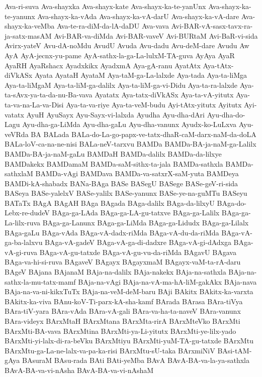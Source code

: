 {Ava-ri-suva
Ava-shayxka
Ava-shayx-kate
Ava-shayx-ka-te-yanUnx
Ava-shayx-ka-te-yanunx
Ava-shayx-ka-vAda
Ava-shayx-ka-vA-darU
Ava-shayx-ka-vA-dare
Ava-shayx-ka-veMba
Ava-te-ra-diM-da-lA-daDU
Ava-vava
Avi-BAR-vA-sasx-tavx-ra-ja-satx-masAM
Avi-BAR-va-diMda
Avi-BAR-vaveV
Avi-BURtaM
Avi-BaR-vi-sida
Avirx-yateV
Avu-dA-noMdu
AvudU
Avuda
Avu-dadu
Avu-deM-dare
Avudu
Aw
AyA
AyA-jecnx-yu-pame
AyA-sathx-la-ga-La-lulxM-TA-guva
AyAya
AyaR
AyaRH
AyaRshacx
Ayadxkikx
AyadxmA
Aya-gA-ranu
AyatAtx
Aya-tAtx-diVkASx
Ayata
AyataH
AyataM
Aya-taM-ga-La-lalxde
Aya-tada
Aya-ta-liMga
Aya-ta-liMgaM
Aya-ta-liM-ga-dalilx
Aya-ta-liM-ga-vi-Didu
Aya-ta-ra-lalxde
Aya-ta-sAvx-ya-ta-da-nu-Ba-vava
Ayatatx
Aya-tatx-diVkASx
Aya-ta-vA-yitutx
Aya-ta-va-na-La-va-Disi
Aya-ta-va-riye
Aya-ta-veM-budu
Ayi-tAtx-yitutx
Ayitutx
Ayi-vatatx
AyuH
AyuSayx
Ayu-Sayx-vi-lalxda
Ayudha
Ayu-dha-dAri
Ayu-dha-do-Lagu
Ayu-dha-ga-LiMda
Ayu-dha-gaLu
Ayu-dha-vanunx
Ayudx-ko-LuLxva
Ayu-veVRda
BA
BALada
BALa-do-La-go-papx-ve-tatx-dhaR-caM-darx-naM-da-doLA
BALa-loV-ca-na-ne-nisi
BALa-neV-tarxvu
BAMDa
BAMDa-BA-ja-naM-ga-Lalilx
BAMDa-BA-ja-naM-gaLu
BAMDaH
BAMDa-dalilx
BAMDa-da-lilxye
BAMDakekx
BAMDamaM
BAMDa-saM-sithx-ta-jala
BAMDa-sathxla
BAMDa-sathxlaM
BAMDa-vAgi
BAMDava
BAMDa-va-satxrX-saM-yuta
BAMDeya
BAMDi-kA-shabadx
BANa-BAga
BASe
BASegU
BASege
BASe-geV-ri-sida
BASeya
BASe-yalelxV
BASe-yalilx
BASe-yanunx
BASe-ye-na-guMTu
BASeyu
BATaTx
BAgA
BAgAH
BAga
BAgada
BAga-dalilx
BAga-da-lilxyU
BAga-do-Lebx-re-dudeV
BAga-ga-LAda
BAga-ga-LA-gu-tatxve
BAga-ga-Lalilx
BAga-ga-La-lilx-ruva
BAga-ga-Lanunx
BAga-ga-LiMda
BAga-ga-Lidudx
BAga-ga-Lilalx
BAga-gaLu
BAga-vAda
BAga-vA-dadx-riMda
BAga-vA-du-da-riMda
BAga-vA-ga-ba-lalxvu
BAga-vA-gadeV
BAga-vA-ga-di-dadxre
BAga-vA-gi-dAdxga
BAga-vA-gi-ruva
BAga-vA-gu-tatxde
BAga-vA-gu-vu-da-riMda
BAgavU
BAgava
BAga-va-hi-si-ruva
BAgaveV
BAgayx
BAgayxmaM
BAgayx-vaM-ta-rA-daru
BAgeV
BAjana
BAjanaM
BAja-na-dalilx
BAja-nakekx
BAja-na-sathxla
BAja-na-sathx-la-mu-tatx-mamf
BAja-na-vAgi
BAja-na-vA-ma-hA-liM-gakAkx
BAja-nava
BAja-na-va-ni-kikxTuTx
BAja-na-veM-deM-baru
BAji
BAkitx
BAkitx-ka-varxta
BAkitx-ka-viva
BAnu-koV-Ti-parx-kA-sha-kamf
BArada
BArasa
BAra-tiVya
BAra-tiV-yara
BAra-vAda
BAra-vA-gali
BAra-va-ha-ta-naveV
BAra-vanunx
BAra-videyx
BArxMtaH
BArxMtana
BArxMta-rirA
BArxMteVko
BArxMti
BArxMti-BA-vava
BArxMtina
BArxMti-ya-Li-yitutx
BArxMti-ye-lilx-yado
BArxMti-yi-lalx-di-ra-beVku
BArxMtiyu
BArxMti-yuM-TA-gu-tatxde
BArxMtu
BArxMtu-ga-La-ne-lalx-va-pa-ka-risi
BArxMtu-sU-taka
BArxmiNiV
BAsi-tAM-gAya
BAsuraM
BAsu-rada
BAti
BAti-yeMba
BAvA
BAvA-BA-va-la-ya-sathxla
BAvA-BA-va-vi-nAsha
BAvA-BA-va-vi-nAshaM
}
